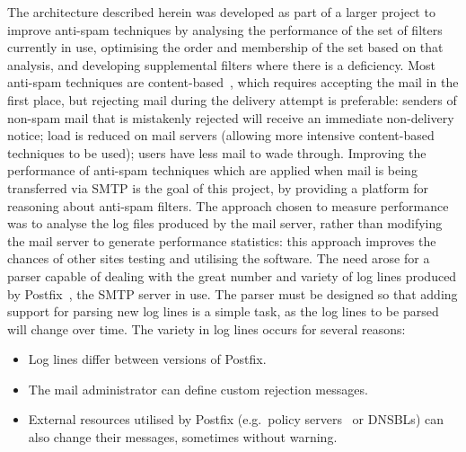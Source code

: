 \documentclass[draft]{svmult}
\begin{document}
The architecture described herein was developed as part of a larger project
to improve anti-spam techniques by analysing the performance of the set of
filters currently in use, optimising the order and membership of the set
based on that analysis, and developing supplemental filters where there is
a deficiency.  Most anti-spam techniques are
content-based~\cite{a-plan-for-spam, word-stemming, relaxed-online-svms},
which requires accepting the mail in the first place, but rejecting mail
during the delivery attempt is preferable: senders of non-spam mail that is
mistakenly rejected will receive an immediate non-delivery notice; load is
reduced on mail servers (allowing more intensive content-based techniques
to be used); users have less mail to wade through.  Improving the
performance of anti-spam techniques which are applied when mail is being
transferred via SMTP\footnotemark{} is the goal of this project, by
providing a platform for reasoning about anti-spam filters.  The approach
chosen to measure performance was to analyse the log files produced by the
mail server, rather than modifying the mail server to generate performance
statistics: this approach improves the chances of other sites testing and
utilising the software.  The need arose for a parser capable of dealing
with the great number and variety of log lines produced by
Postfix~\cite{postfix}, the SMTP server in use.  The parser must be
designed so that adding support for parsing new log lines is a simple task,
as the log lines to be parsed will change over time.  The variety in log
lines occurs for several reasons:

\begin{itemize}

    \item Log lines differ between versions of Postfix.
        
    \item The mail administrator can define custom rejection
        messages.

    \item External resources utilised by Postfix (e.g.\ policy
        servers~\cite{policy-servers} or DNSBLs) can also change their
        messages, sometimes without warning.

\end{itemize}
\end{document}
